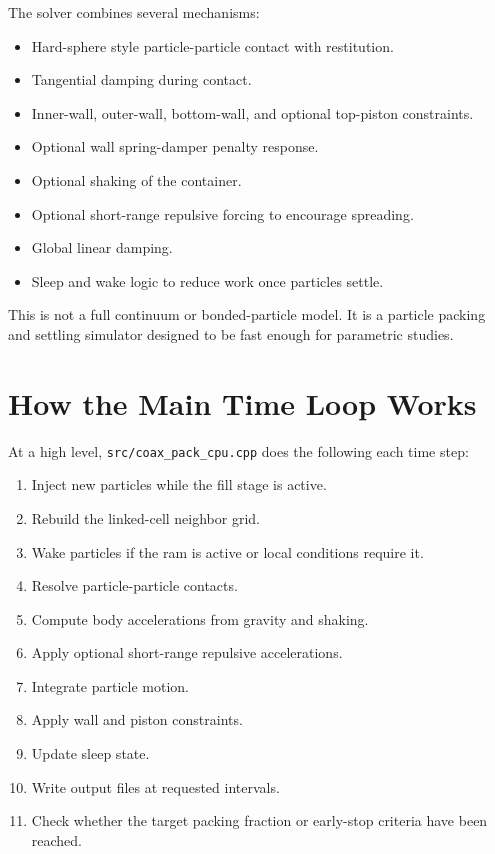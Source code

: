 \documentclass[11pt]{article}
\begin{document}
The solver combines several mechanisms:
\begin{itemize}
  \item Hard-sphere style particle-particle contact with restitution.
  \item Tangential damping during contact.
  \item Inner-wall, outer-wall, bottom-wall, and optional top-piston constraints.
  \item Optional wall spring-damper penalty response.
  \item Optional shaking of the container.
  \item Optional short-range repulsive forcing to encourage spreading.
  \item Global linear damping.
  \item Sleep and wake logic to reduce work once particles settle.
\end{itemize}

This is not a full continuum or bonded-particle model. It is a particle packing and settling simulator designed to be fast enough for parametric studies.

\section{How the Main Time Loop Works}

At a high level, \texttt{src/coax\_pack\_cpu.cpp} does the following each time step:
\begin{enumerate}
  \item Inject new particles while the fill stage is active.
  \item Rebuild the linked-cell neighbor grid.
  \item Wake particles if the ram is active or local conditions require it.
  \item Resolve particle-particle contacts.
  \item Compute body accelerations from gravity and shaking.
  \item Apply optional short-range repulsive accelerations.
  \item Integrate particle motion.
  \item Apply wall and piston constraints.
  \item Update sleep state.
  \item Write output files at requested intervals.
  \item Check whether the target packing fraction or early-stop criteria have been reached.
\end{enumerate}
\end{document}
